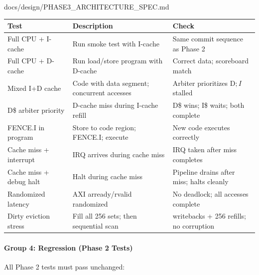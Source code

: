 \begin{relocated}{docs/design/PHASE3_ARCHITECTURE_SPEC.md}
{
\begin{longtable}[]{@{}
  >{\raggedright\arraybackslash}p{}
  >{\raggedright\arraybackslash}p{}
  >{\raggedright\arraybackslash}p{}@{}}
\toprule\noalign{}
\begin{minipage}[b]{\linewidth}\raggedright
Test
\end{minipage} & \begin{minipage}[b]{\linewidth}\raggedright
Description
\end{minipage} & \begin{minipage}[b]{\linewidth}\raggedright
Check
\end{minipage} \\
\midrule\noalign{}
\endhead
\bottomrule\noalign{}
\endlastfoot
Full CPU + I-cache & Run smoke test with I-cache & Same commit sequence
as Phase 2 \\
Full CPU + D-cache & Run load/\allowbreak{}store program with D-cache &
Correct data; scoreboard match \\
Mixed I+D cache & Code with data segment; concurrent accesses & Arbiter
prioritizes D\(; I\) stalled \\
D\$ arbiter priority & D-cache miss during I-cache refill & D\$ wins;
I\$ waits; both complete \\
FENCE.I in program & Store to code region; FENCE.I; execute & New code
executes correctly \\
Cache miss + interrupt & IRQ arrives during cache miss & IRQ taken after
miss completes \\
Cache miss + debug halt & Halt during cache miss & Pipeline drains after
miss; halts cleanly \\
Randomized latency & AXI arready/\allowbreak{}rvalid randomized & No
deadlock; all accesses complete \\
Dirty eviction stress & Fill all 256 sets; then sequential scan & 256
writebacks + 256 refills; no corruption \\
\end{longtable}
}

\paragraph{Group 4: Regression (Phase 2 Tests)}\label{ds:ch:phase3-architecture:group-4-regression-phase-2-tests}

All Phase 2 tests must pass unchanged:


\end{relocated}
